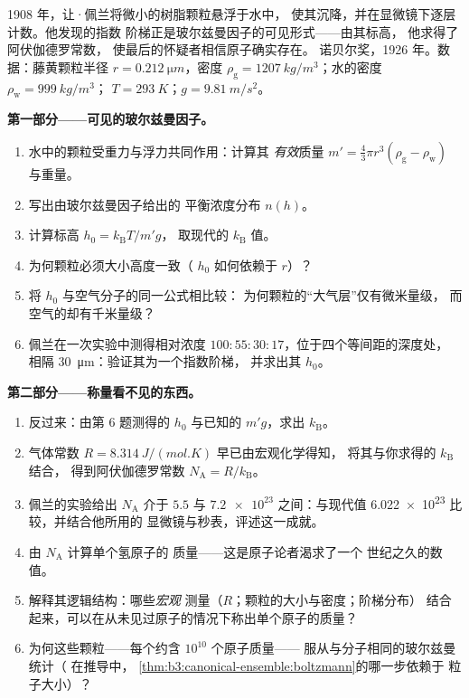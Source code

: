 \begin{problem}\label{pb:b3:canonical-ensemble:1}
1908 年，让·佩兰将微小的树脂颗粒悬浮于水中，
使其沉降，并在显微镜下逐层计数。他发现的指数
阶梯正是玻尔兹曼因子的可见形式——由其标高，
他求得了阿伏伽德罗常数，
使最后的怀疑者相信原子确实存在。
诺贝尔奖，1926 年。数据：藤黄颗粒半径 $r =
\qty{0.212}{\micro m}$，密度 $\rho_{\text{g}} =
\qty{1207}{kg/m^3}$；水的密度 $\rho_{\text{w}} = \qty{999}{kg/m^3}$；
$T = \qty{293}{K}$；$g = \qty{9.81}{m/s^2}$。

\medskip\noindent\textbf{第一部分——可见的玻尔兹曼因子。}
\begin{enumerate}
  \item 水中的颗粒受重力与浮力共同作用：计算其
        \emph{有效}质量 $m' = \tfrac43\pi r^3(\rho_{\text{g}}
        - \rho_{\text{w}})$ 与重量。
  \item 写出由玻尔兹曼因子给出的
        平衡浓度分布 $n(h)$。
  \item 计算标高 $h_0 = k_{\text{B}}T/m'g$，
        取现代的 $k_{\text{B}}$ 值。
  \item 为何颗粒必须大小高度一致（
        $h_0$ 如何依赖于 $r$）？
  \item 将 $h_0$ 与空气分子的同一公式相比较：
        为何颗粒的“大气层”仅有微米量级，
        而空气的却有千米量级？
  \item 佩兰在一次实验中测得相对浓度
        $100 : 55 : 30 : 17$，位于四个等间距的深度处，
        相隔 \qty{30}{\micro m}：验证其为一个指数阶梯，
        并求出其 $h_0$。
\end{enumerate}

\medskip\noindent\textbf{第二部分——称量看不见的东西。}
\begin{enumerate}[resume]
  \item 反过来：由第 6 题测得的 $h_0$ 与已知的
        $m'g$，求出 $k_{\text{B}}$。
  \item 气体常数 $R = \qty{8.314}{J/(mol.K)}$ 早已由宏观化学得知，
        将其与你求得的 $k_{\text{B}}$ 结合，
        得到阿伏伽德罗常数 $N_{\text{A}} =
        R/k_{\text{B}}$。
  \item 佩兰的实验给出 $N_{\text{A}}$ 介于 $5.5$ 与
        $\num{7.2e23}$ 之间：与现代值
        \num{6.022e23} 比较，并结合他所用的
        显微镜与秒表，评述这一成就。
  \item 由 $N_{\text{A}}$ 计算单个氢原子的
        质量——这是原子论者渴求了一个
        世纪之久的数值。
  \item 解释其逻辑结构：哪些\emph{宏观}
        测量（$R$；颗粒的大小与密度；阶梯分布）
        结合起来，可以在从未见过原子的情况下称出单个原子的质量？
  \item 为何这些颗粒——每个约含 $10^{10}$ 个原子质量——
        服从与分子相同的玻尔兹曼统计（
        在推导中，
        \cref{thm:b3:canonical-ensemble:boltzmann}的哪一步依赖于
        粒子大小）？
\end{enumerate}


\end{problem}
